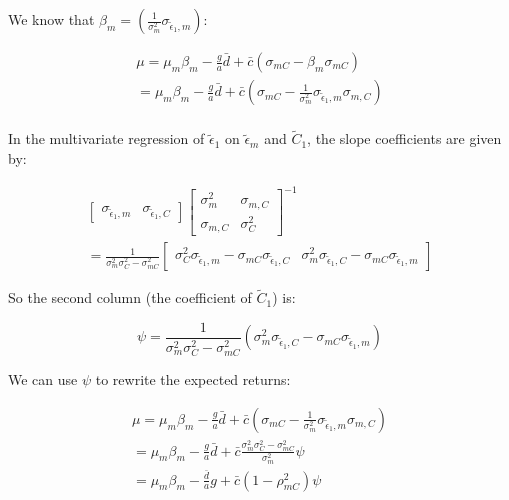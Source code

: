 We know that $\beta_m = (\frac{1}{\sigma^2_m}\sigma_{\tilde{\epsilon}_1, m})$:

\begin{equation}
    \begin{aligned}
        \mu = \mu_m \beta_m - \frac{g}{a} \bar{d} + \bar{c}(\sigma_{mC} - \beta_m \sigma_{mC}) \\
        = \mu_m \beta_m - \frac{g}{a} \bar{d} + \bar{c}(\sigma_{mC} -  \frac{1}{\sigma^2_m}\sigma_{\tilde{\epsilon}_1, m} \sigma_{m, C}) \\
    \end{aligned}
\end{equation}

In the multivariate regression of $\tilde{\epsilon}_1$ on 
$\tilde{\epsilon}_m$ and $\tilde{C}_1$, 
the slope coefficients are given by:

\begin{equation}
    \begin{aligned}
    \begin{bmatrix} \sigma_{\tilde{\epsilon}_1, m} & \sigma_{\tilde{\epsilon}_1, C} \end{bmatrix} 
    \begin{bmatrix} \sigma^2_{m} & \sigma_{m, C} \\ \sigma_{m, C} & \sigma^2_{C} \end{bmatrix}^{-1} \\
        = \frac{1}{\sigma^2_m \sigma^2_C - \sigma^2_{mC}} \begin{bmatrix} \sigma_C^2 \sigma_{\tilde{\epsilon}_1, m} - \sigma_{mC} \sigma_{\tilde{\epsilon}_1, C} & \sigma_m^2 \sigma_{\tilde{\epsilon}_1, C} - \sigma_{mC} \sigma_{\tilde{\epsilon}_1, m} \end{bmatrix}
\end{aligned}
\end{equation}

So the second column (the coefficient of $\tilde{C}_1$) is:

\begin{equation}
    \psi = \frac{1}{\sigma^2_m \sigma^2_C - \sigma^2_{mC}} (\sigma_m^2 \sigma_{\tilde{\epsilon}_1, C} - \sigma_{mC} \sigma_{\tilde{\epsilon}_1, m})
\end{equation}

We can use $\psi$ to rewrite the expected returns:

\begin{equation}
    \begin{aligned}
    \mu = \mu_m \beta_m - \frac{g}{a} \bar{d} + \bar{c}(\sigma_{mC} -  \frac{1}{\sigma^2_m}\sigma_{\tilde{\epsilon}_1, m} \sigma_{m, C}) \\
    = \mu_m \beta_m - \frac{g}{a} \bar{d} + \bar{c}\frac{\sigma^2_m \sigma^2_C - \sigma^2_{mC}}{\sigma^2_m} \psi \\
    = \mu_m \beta_m - \frac{\bar{d}}{a}g + \bar{c}(1 - \rho^2_{mC}) \psi 
    \end{aligned}
\end{equation}

